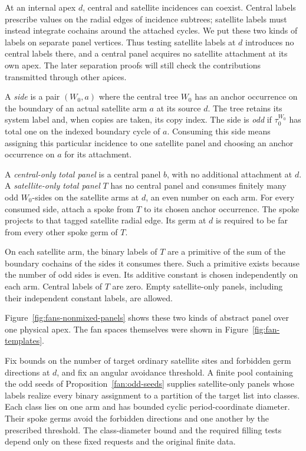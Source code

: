 At an internal apex $d$, central and satellite incidences can coexist.
Central labels prescribe values on the radial edges of incidence subtrees;
satellite labels must instead integrate cochains around the attached
cycles. We put these two kinds of labels on separate panel vertices.
Thus testing satellite labels at $d$ introduces no central labels there,
and a central panel acquires no satellite attachment at its own apex.
The later separation proofs will still check the contributions transmitted
through other apices.

\begin{definition}\label{boundary:total-panels}
A \emph{side} is a pair $(W_0,a)$ where the central tree $W_0$ has an
anchor occurrence on the boundary of an actual satellite arm $a$ at its
source $d$. The tree retains its system label and,
when copies are taken, its copy index. The side is \emph{odd} if
$\tau_0^{W_0}$ has total one on the indexed boundary cycle of $a$.
Consuming this side means assigning this particular incidence to one
satellite panel and choosing an anchor occurrence on $a$ for its attachment.

A \emph{central-only total panel} is a central panel $b$, with no additional
attachment at $d$. A \emph{satellite-only total panel} $T$ has no central
panel and consumes finitely many odd $W_0$-sides on the satellite arms at
$d$, an even number on each arm. For every consumed side, attach a spoke
from $T$ to its chosen anchor occurrence. The spoke projects to that tagged
satellite radial edge. Its germ at $d$ is required to be far from every
other spoke germ of $T$.

On each satellite arm, the binary labels of $T$ are a primitive of the sum
of the boundary cochains of the sides it consumes there. Such a primitive
exists because the number of odd sides is even. Its additive constant is
chosen independently on each arm. Central labels of $T$ are zero. Empty
satellite-only panels, including their independent constant labels, are
allowed.
\end{definition}

Figure~\ref{fig:fans-nonmixed-panels} shows these two kinds of abstract
panel over one physical apex. The fan spaces themselves were shown in
Figure~\ref{fig:fan-templates}.


\begin{lemma}\label{boundary:satellite-profiles}
Fix bounds on the number of target ordinary satellite sites and forbidden
germ directions at $d$, and fix an angular avoidance threshold. A finite
pool containing the odd seeds of Proposition~\ref{fan:odd-seeds} supplies
satellite-only panels whose labels realize every binary assignment to a
partition of the target list into classes. Each class lies on one arm and
has bounded cyclic period-coordinate diameter. Their spoke germs avoid the
forbidden directions and one another by the prescribed threshold. The
class-diameter bound and the required filling tests depend only on these
fixed requests and the original finite data.
\end{lemma}

